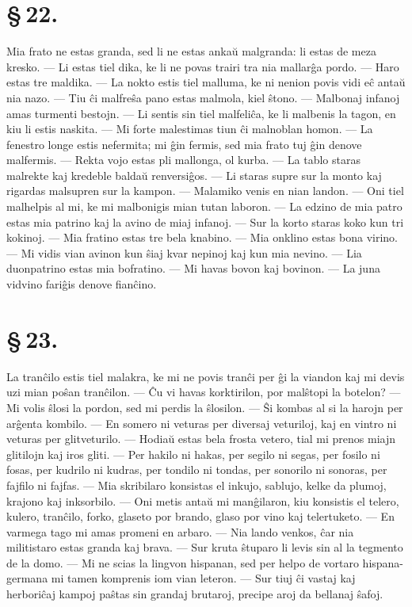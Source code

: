 \section*{\S\,22.}
Mia frato ne estas granda, sed li ne estas anka\u u malgranda: li
estas de meza kresko. --- Li estas tiel dika, ke li ne povas trairi
tra nia mallar\^ga pordo. --- Haro estas tre maldika. --- La nokto
estis tiel malluma, ke ni nenion povis vidi e\^c anta\u u nia nazo.
--- Tiu \^ci malfre\^sa pano estas malmola, kiel \^stono. --- Malbonaj
infanoj amas turmenti bestojn. --- Li sentis sin tiel malfeli\^ca,
ke li malbenis la tagon, en kiu li estis naskita. --- Mi forte
malestimas tiun \^ci malnoblan homon. --- La fenestro longe estis
nefermita; mi \^gin fermis, sed mia frato tuj \^gin denove
malfermis. --- Rekta vojo estas pli mallonga, ol kurba. --- La tablo
staras malrekte kaj kredeble balda\u u renversi\^gos. --- Li staras
supre sur la monto kaj rigardas malsupren sur la kampon. ---
Malamiko venis en nian landon. --- Oni tiel malhelpis al mi, ke mi
malbonigis mian tutan laboron. --- La edzino de mia patro estas mia
patrino kaj la avino de miaj infanoj. --- Sur la korto staras koko
kun tri kokinoj. --- Mia fratino estas tre bela knabino. --- Mia
onklino estas bona virino. --- Mi vidis vian avinon kun \^siaj kvar
nepinoj kaj kun mia nevino. --- Lia duonpatrino estas mia bofratino.
--- Mi havas bovon kaj bovinon. --- La juna vidvino fari\^gis denove
fian\^cino.


\section*{\S\,23.}
La tran\^cilo estis tiel malakra, ke mi ne povis tran\^ci per \^gi
la viandon kaj mi devis uzi mian po\^san tran\^cilon. --- \^Cu vi
havas korktirilon, por mal\^stopi la botelon? --- Mi volis \^slosi
la pordon, sed mi perdis la \^slosilon. --- \^Si kombas al si la
harojn per ar\^genta kombilo. --- En somero ni veturas per diversaj
veturiloj, kaj en vintro ni veturas per glitveturilo. --- Hodia\u u
estas bela frosta vetero, tial mi prenos miajn glitilojn kaj iros
gliti. --- Per hakilo ni hakas, per segilo ni segas, per fosilo ni
fosas, per kudrilo ni kudras, per tondilo ni tondas, per sonorilo ni
sonoras, per fajfilo ni fajfas. --- Mia skribilaro konsistas el
inkujo, sablujo, kelke da plumoj, krajono kaj inksorbilo. --- Oni
metis anta\u u mi man\^gilaron, kiu konsistis el telero, kulero,
tran\^cilo, forko, glaseto por brando, glaso por vino kaj
telertuketo. --- En varmega tago mi amas promeni en arbaro. --- Nia
lando venkos, \^car nia militistaro estas granda kaj brava. --- Sur
kruta \^stuparo li levis sin al la tegmento de la domo. --- Mi ne
scias la lingvon hispanan, sed per helpo de vortaro hispana-germana
mi tamen komprenis iom vian leteron. --- Sur tiuj \^ci vastaj kaj
herbori\^caj kampoj pa\^stas sin grandaj brutaroj, precipe aroj da
bellanaj \^safoj.

